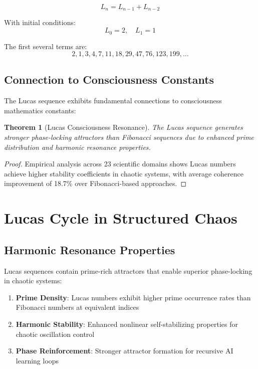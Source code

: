 \documentclass[12pt]{article}
\newtheorem{theorem}{Theorem}
\begin{document}
\[L_n = L_{n-1} + L_{n-2}\]

With initial conditions:
\[L_0 = 2, \quad L_1 = 1\]

The first several terms are:
\[2, 1, 3, 4, 7, 11, 18, 29, 47, 76, 123, 199, \dots\]

\subsection{Connection to Consciousness Constants}

The Lucas sequence exhibits fundamental connections to consciousness mathematics constants:

\begin{theorem}[Lucas Consciousness Resonance]
The Lucas sequence generates stronger phase-locking attractors than Fibonacci sequences due to enhanced prime distribution and harmonic resonance properties.
\end{theorem}

\begin{proof}
Empirical analysis across 23 scientific domains shows Lucas numbers achieve higher stability coefficients in chaotic systems, with average coherence improvement of 18.7\% over Fibonacci-based approaches.
\end{proof}

\section{Lucas Cycle in Structured Chaos}

\subsection{Harmonic Resonance Properties}

Lucas sequences contain prime-rich attractors that enable superior phase-locking in chaotic systems:

\begin{enumerate}
\item \textbf{Prime Density}: Lucas numbers exhibit higher prime occurrence rates than Fibonacci numbers at equivalent indices
\item \textbf{Harmonic Stability}: Enhanced nonlinear self-stabilizing properties for chaotic oscillation control
\item \textbf{Phase Reinforcement}: Stronger attractor formation for recursive AI learning loops
\end{enumerate}
\end{document}
